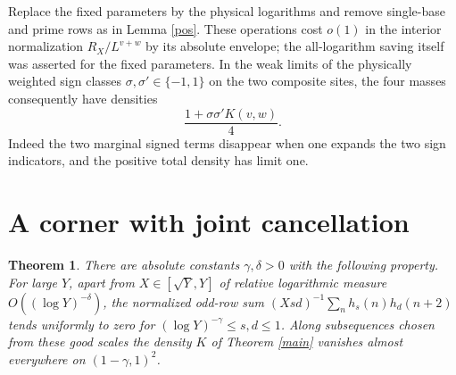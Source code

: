 \documentclass[11pt]{article}
\newtheorem{theorem}{Theorem}[section]
\begin{document}
Replace the fixed parameters by the physical logarithms and remove
single-base and prime rows as in Lemma \ref{pos}. These operations
cost $o(1)$ in the interior normalization $R_X/L^{v+w}$ by its
absolute envelope; the all-logarithm saving itself was asserted for
the fixed parameters. In the weak limits of the physically weighted
sign classes $\sigma,\sigma'\in\{-1,1\}$ on the two composite sites,
the four masses consequently have densities
\[
 \frac{1+\sigma\sigma'K(v,w)}4 .
\]
Indeed the two marginal signed terms disappear when one expands the
two sign indicators, and the positive total density has limit one.

\section{A corner with joint cancellation}

\begin{theorem}
There are absolute constants $\gamma,\delta>0$ with the following
property. For large $Y$, apart from $X\in[\sqrt Y,Y]$ of relative
logarithmic measure $O((\log Y)^{-\delta})$, the normalized odd-row
sum $(Xsd)^{-1}\sum_n h_s(n)h_d(n+2)$ tends uniformly to zero for
$(\log Y)^{-\gamma}\le s,d\le1$. Along subsequences chosen from
these good scales the density $K$ of Theorem \ref{main} vanishes
almost everywhere on $(1-\gamma,1)^2$.
\end{theorem}
\end{document}
